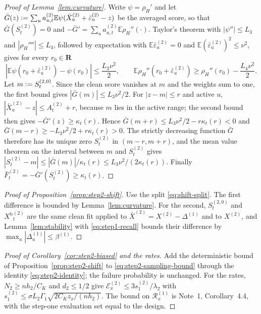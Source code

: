 \documentclass[11pt]{article}
\newcommand{\E}{\mathbb{E}}
\newcommand{\R}{\mathbf{R}}
\newcommand{\eqdef}{\mathrel{\vcentcolon=}}
\newcommand{\Signal}{X}
\newcommand{\IMFs}{S}
\newcommand{\BiasedSignal}{X^{\mathrm b}}
\newcommand{\IF}{F}
\theoremstyle{definition}
\begin{document}
\begin{proof}[Proof of Lemma~\ref{lem:curvature}]
Write \(\psi=\rho_H'\) and let
\(\bar G(z)\eqdef\sum_u a^{(2)}_{u,t}\E\psi(\bar\Signal^{(2)}_u+\bar\varepsilon^{(2)}_u-z)\)
be the averaged score, so that \(\bar G(\IMFs^{(2)}_t)=0\) and
\(-\bar G'=\sum_ua^{(2)}_{u,t}\E\rho_H''(\cdot)\).  Taylor's theorem with
\(|\psi''|\leq L_3\) and \(|\rho_H''''|\leq L_4\), followed by expectation
with \(\E\bar\varepsilon^{(2)}_u=0\) and \(\E(\bar\varepsilon^{(2)}_u)^2\leq\nu^2\),
gives for every \(r_0\in\R\)
\[
  |\E\psi(r_0+\bar\varepsilon^{(2)}_u)-\psi(r_0)|\leq\frac{L_3\nu^2}{2},
  \qquad
  \E\rho_H''(r_0+\bar\varepsilon^{(2)}_u)\geq\rho_H''(r_0)-\frac{L_4\nu^2}{2}.
\]
Let \(m\eqdef\IMFs^{(2,0)}_t\).  Since the clean score vanishes at \(m\)
and the weights sum to one, the first bound gives
\(|\bar G(m)|\leq L_3\nu^2/2\).  For \(|z-m|\leq r\) and active \(u\),
\(|\bar\Signal^{(2)}_u-z|\leq A^{(2)}_t+r\), because \(m\) lies in the
active range; the second bound then gives \(-\bar G'(z)\geq\kappa_t(r)\).
Hence \(\bar G(m+r)\leq L_3\nu^2/2-r\kappa_t(r)<0\) and
\(\bar G(m-r)\geq-L_3\nu^2/2+r\kappa_t(r)>0\).  The strictly decreasing
function \(\bar G\) therefore has its unique zero \(\IMFs^{(2)}_t\) in
\((m-r,m+r)\), and the mean value theorem on the interval between \(m\) and
\(\IMFs^{(2)}_t\) gives
\(|\IMFs^{(2)}_t-m|\leq|\bar G(m)|/\kappa_t(r)\leq L_3\nu^2/(2\kappa_t(r))\).
Finally \(\bar\IF^{(2)}_t=-\bar G'(\IMFs^{(2)}_t)\geq\kappa_t(r)\).
\end{proof}

\begin{proof}[Proof of Proposition~\ref{prop:step2-shift}]
Use the split \eqref{eq:shift-split}.  The first difference is bounded by
Lemma~\ref{lem:curvature}.  For the second, \(\IMFs^{(2,0)}_t\) and
\(\BiasedSignal{}^{(2)}_t\) are the same clean fit applied to
\(\bar\Signal^{(2)}=\Signal^{(2)}-\Delta^{(1)}\) and to \(\Signal^{(2)}\),
and Lemma~\ref{lem:stability} with \eqref{eq:step1-recall} bounds their
difference by \(\max_u|\Delta^{(1)}_u|\leq\beta^{(1)}\).
\end{proof}

\begin{proof}[Proof of Corollary~\ref{cor:step2-biased} and the rates]
Add the deterministic bound of Proposition~\ref{prop:step2-shift} to
\eqref{eq:step2-sampling-bound} through the identity
\eqref{eq:step2-identity}; the failure probability is unchanged.  For the
rates, \(N_2\geq nh_2/C_K\) and \(d_2\leq1/2\) give
\(\mathcal E^{(2)}_x\leq3s^{(2)}_1/\lambda_2\) with
\(s^{(2)}_1\leq\sigma L_2\Gamma_1\sqrt{2C_Kz_x/(nh_2)}\).  The bound on
\(\mathcal R^{(1)}_x\) is Note~1, Corollary~4.4, with the step-one
evaluation set equal to the design.
\end{proof}
\end{document}
